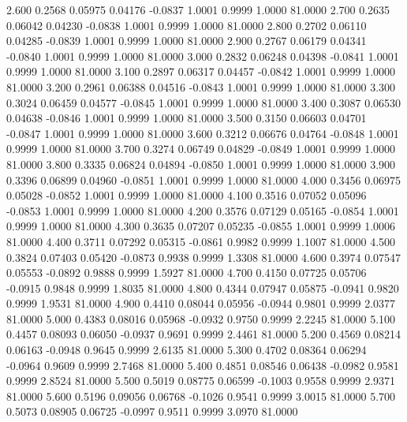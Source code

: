    2.600   0.2568   0.05975   0.04176  -0.0837   1.0001   0.9999   1.0000  81.0000
   2.700   0.2635   0.06042   0.04230  -0.0838   1.0001   0.9999   1.0000  81.0000
   2.800   0.2702   0.06110   0.04285  -0.0839   1.0001   0.9999   1.0000  81.0000
   2.900   0.2767   0.06179   0.04341  -0.0840   1.0001   0.9999   1.0000  81.0000
   3.000   0.2832   0.06248   0.04398  -0.0841   1.0001   0.9999   1.0000  81.0000
   3.100   0.2897   0.06317   0.04457  -0.0842   1.0001   0.9999   1.0000  81.0000
   3.200   0.2961   0.06388   0.04516  -0.0843   1.0001   0.9999   1.0000  81.0000
   3.300   0.3024   0.06459   0.04577  -0.0845   1.0001   0.9999   1.0000  81.0000
   3.400   0.3087   0.06530   0.04638  -0.0846   1.0001   0.9999   1.0000  81.0000
   3.500   0.3150   0.06603   0.04701  -0.0847   1.0001   0.9999   1.0000  81.0000
   3.600   0.3212   0.06676   0.04764  -0.0848   1.0001   0.9999   1.0000  81.0000
   3.700   0.3274   0.06749   0.04829  -0.0849   1.0001   0.9999   1.0000  81.0000
   3.800   0.3335   0.06824   0.04894  -0.0850   1.0001   0.9999   1.0000  81.0000
   3.900   0.3396   0.06899   0.04960  -0.0851   1.0001   0.9999   1.0000  81.0000
   4.000   0.3456   0.06975   0.05028  -0.0852   1.0001   0.9999   1.0000  81.0000
   4.100   0.3516   0.07052   0.05096  -0.0853   1.0001   0.9999   1.0000  81.0000
   4.200   0.3576   0.07129   0.05165  -0.0854   1.0001   0.9999   1.0000  81.0000
   4.300   0.3635   0.07207   0.05235  -0.0855   1.0001   0.9999   1.0006  81.0000
   4.400   0.3711   0.07292   0.05315  -0.0861   0.9982   0.9999   1.1007  81.0000
   4.500   0.3824   0.07403   0.05420  -0.0873   0.9938   0.9999   1.3308  81.0000
   4.600   0.3974   0.07547   0.05553  -0.0892   0.9888   0.9999   1.5927  81.0000
   4.700   0.4150   0.07725   0.05706  -0.0915   0.9848   0.9999   1.8035  81.0000
   4.800   0.4344   0.07947   0.05875  -0.0941   0.9820   0.9999   1.9531  81.0000
   4.900   0.4410   0.08044   0.05956  -0.0944   0.9801   0.9999   2.0377  81.0000
   5.000   0.4383   0.08016   0.05968  -0.0932   0.9750   0.9999   2.2245  81.0000
   5.100   0.4457   0.08093   0.06050  -0.0937   0.9691   0.9999   2.4461  81.0000
   5.200   0.4569   0.08214   0.06163  -0.0948   0.9645   0.9999   2.6135  81.0000
   5.300   0.4702   0.08364   0.06294  -0.0964   0.9609   0.9999   2.7468  81.0000
   5.400   0.4851   0.08546   0.06438  -0.0982   0.9581   0.9999   2.8524  81.0000
   5.500   0.5019   0.08775   0.06599  -0.1003   0.9558   0.9999   2.9371  81.0000
   5.600   0.5196   0.09056   0.06768  -0.1026   0.9541   0.9999   3.0015  81.0000
   5.700   0.5073   0.08905   0.06725  -0.0997   0.9511   0.9999   3.0970  81.0000
